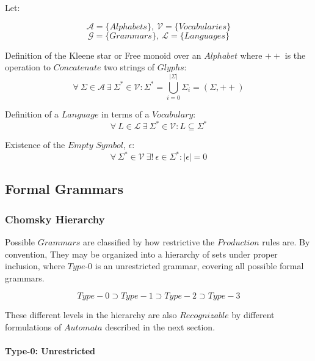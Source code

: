 \documentclass{article}
\begin{document}
Let:

\[
    \mathcal{A} = \{ Alphabets \},\: \mathcal{V} = \{ Vocabularies \}
\] \[
    \mathcal{G} = \{ Grammars \},\: \mathcal{L} = \{ Languages \}
\]

    \begin{description}

    \item Definition of the Kleene star or Free monoid over an
      $Alphabet$ where $++$ is the operation to $Concatenate$ two
      strings of $Glyphs$:
    \[
        \forall \: \Sigma \in \mathcal{A} \:
        \exists \: \Sigma^* \in \mathcal{V}
        : \Sigma^* = \bigcup_{i=0}^{|\Sigma|} \Sigma_i
        = (\Sigma,++)
    \]

    \item Definition of a $Language$ in terms of a $Vocabulary$:
    \[
        \forall \: L \in \mathcal{L} \:
        \exists \: \Sigma^* \in \mathcal{V}
        : L \subseteq \Sigma^*
    \]

    \item Existence of the $Empty$ $Symbol$, $\epsilon$:
    \[
        \forall \: \Sigma^* \in \mathcal{V} \:
        \exists ! \: \epsilon \in \Sigma^*
        : |\epsilon|=0
    \]

    \end{description}

\subsection{Formal Grammars}

\subsubsection{Chomsky Hierarchy}

Possible $Grammars$ are classified by how restrictive the $Production$
rules are. By convention, They may be organized into a hierarchy of
sets under proper inclusion, where $Type$-$0$ is an unrestricted
grammar, covering all possible formal grammars.

\[
    Type-0 \supset Type-1 \supset Type-2 \supset Type-3
\]

 These different levels in the hierarchy are also $Recognizable$ by
 different formulations of $Automata$ described in the next section.

\paragraph{Type-0: Unrestricted}
\end{document}
